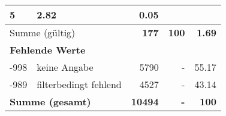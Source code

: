 \begin{longtable}{lXrrr}
       \num{5} &
       \num[round-mode=places,round-precision=2]{2,82} &
         \num[round-mode=places,round-precision=2]{0,05} \\
     \midrule
     \multicolumn{2}{l}{Summe (gültig)} &
       \textbf{\num{177}} &
     \textbf{100} &
       \textbf{\num[round-mode=places,round-precision=2]{1,69}} \\
     \multicolumn{5}{l}{\textbf{Fehlende Werte}}\\
       -998 &
       keine Angabe &
         \num{5790} &
        - &
         \num[round-mode=places,round-precision=2]{55,17} \\
       -989 &
       filterbedingt fehlend &
         \num{4527} &
        - &
         \num[round-mode=places,round-precision=2]{43,14} \\
     \midrule
     \multicolumn{2}{l}{\textbf{Summe (gesamt)}} &
          \textbf{\num{10494}} &
        \textbf{-} &
        \textbf{100} \\
     \bottomrule
     \end{longtable}
     
